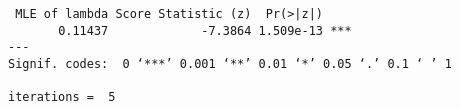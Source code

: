 \begin{verbatim} MLE of lambda Score Statistic (z)  Pr(>|z|)    
       0.11437             -7.3864 1.509e-13 ***
---
Signif. codes:  0 ‘***’ 0.001 ‘**’ 0.01 ‘*’ 0.05 ‘.’ 0.1 ‘ ’ 1

iterations =  5 
\end{verbatim}